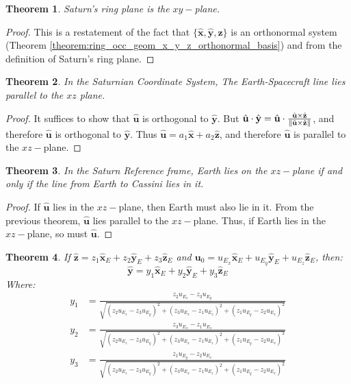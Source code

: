 \documentclass{article}
\theoremstyle{mystyle}
\newtheorem{theorem}{Theorem}[section]
\DeclarePairedDelimiter\norm{\lVert}{\rVert}
\begin{document}
\begin{theorem}
Saturn's ring plane is the $xy-$plane.
\end{theorem}
\begin{proof}
This is a restatement of the fact that $\{\hat{\mathbf{x}},\hat{\mathbf{y}},\hat{\mathbf{z}}\}$ is an orthonormal system (Theorem \ref{theorem:ring_occ_geom_x_y_z_orthonormal_basis}) and from the definition of Saturn's ring plane.
\end{proof}
\begin{theorem}
In the Saturnian Coordinate System, The Earth-Spacecraft line lies parallel to the $xz$ plane.
\end{theorem}
\begin{proof}
It suffices to show that $\hat{\mathbf{u}}$ is orthogonal to $\hat{\mathbf{y}}$. But $\hat{\mathbf{u}}\cdot \hat{\mathbf{y}} = \hat{\mathbf{u}}\cdot \frac{\hat{\mathbf{u}}\times \hat{\mathbf{z}}}{\norm{\hat{\mathbf{u}}\times \hat{\mathbf{z}}}}$, and therefore $\hat{\mathbf{u}}$ is orthogonal to $\hat{\mathbf{y}}$. Thus $\hat{\mathbf{u}} = a_1\hat{\mathbf{x}} + a_2\hat{\mathbf{z}}$, and therefore $\hat{\mathbf{u}}$ is parallel to the $xz-$plane.
\end{proof}
\begin{theorem}
In the Saturn Reference frame, Earth lies on the $xz-$plane if and only if the line from Earth to Cassini lies in it.
\end{theorem}
\begin{proof}
If $\hat{\mathbf{u}}$ lies in the $xz-$plane, then Earth must also lie in it. From the previous theorem, $\hat{\mathbf{u}}$ lies parallel to the $xz-$plane. Thus, if Earth lies in the $xz-$plane, so must $\hat{\mathbf{u}}$.
\end{proof}
\begin{theorem}
If $\hat{\mathbf{z}} = z_1\hat{\mathbf{x}}_{E}+z_2\hat{\mathbf{y}}_{E}+z_3\hat{\mathbf{z}}_{E}$ and $\mathbf{u}_{0} = u_{E_{x}}\hat{\mathbf{x}}_{E}+u_{E_{y}}\hat{\mathbf{y}}_{E}+u_{E_{z}}\hat{\mathbf{z}}_{E}$, then:
\begin{equation*}
\hat{\mathbf{y}} = y_{1}\hat{\mathbf{x}}_{E}+y_2\hat{\mathbf{y}}_{E}+y_3\hat{\mathbf{z}}_{E}
\end{equation*}
Where:
\begin{align*}
y_1 &= \frac{z_2u_{E_{z}} - z_{3}u_{E_{y}}}{\sqrt{(z_2u_{E_{z}}-z_3u_{E_{y}})^2+(z_3u_{E_{x}}-z_1u_{E_{z}})^2+(z_1u_{E_{y}}-z_2u_{E_{x}})^2}} \\
y_2 &= \frac{z_3u_{E_{x}} - z_{1}u_{E_{z}}}{\sqrt{(z_2u_{E_{z}}-z_3u_{E_{y}})^2+(z_3u_{E_{x}}-z_1u_{E_{z}})^2+(z_1u_{E_{y}}-z_2u_{E_{x}})^2}} \\
y_3 &= \frac{z_1u_{E_{y}} - z_2u_{E_{x}}}{\sqrt{(z_2u_{E_{z}}-z_3u_{E_{y}})^2+(z_3u_{E_{x}}-z_1u_{E_{z}})^2+(z_1u_{E_{y}}-z_2u_{E_{x}})^2}}
\end{align*}
\end{theorem}
\end{document}
